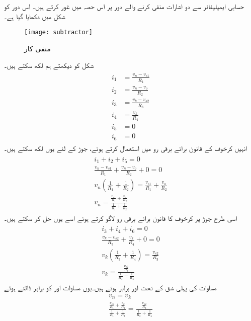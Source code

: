 
حسابی ایمپلیفائر سے دو اشارات منفی کرنے والے دور پر اس حصہ میں غور کرتے ہیں۔ اس دور کو شکل  میں دکھایا گیا ہے۔
\begin{figure}
\centering
\texttt{[image: subtractor]}
\caption{منفی کار}
\label{شکل_منفی_کار}
\end{figure}
شکل کو دیکھتے ہم لکھ سکتے ہیں۔
\begin{gather}
\begin{aligned}
i_1 &= \frac{v_n-v_{s1}}{R_1}\\
i_2&=\frac{v_n-v_o}{R_2}\\
i_3&=\frac{v_k-v_{s2}}{R_3}\\
i_4&=\frac{v_k}{R_4}\\
i_5&=0\\
i_6&=0
\end{aligned}
\end{gather}
انہیں کرخوف کے قانون برائے برقی رو میں  استعمال کرتے ہوئے، جوڑ   کے لئے یوں لکھ سکتے ہیں۔
\begin{gather} \label{مساوات_منفی_کار_منفی_سرے_پر_دباو}
\begin{aligned}
 i_1+i_2+i_5=0\\
\frac{v_n-v_{s1}}{R_1}+\frac{v_n-v_o}{R_2}+0=0\\
v_n \left(\frac{1}{R_1}+\frac{1}{R_2} \right)=\frac{v_{s1}}{R_1}+\frac{v_o}{R_2}\\
v_n=\frac{\frac{v_{s1}}{R_1}+\frac{v_o}{R_2}}{\frac{1}{R_1}+\frac{1}{R_2}}
\end{aligned}
\end{gather}
اسی طرح جوڑ   پر کرخوف کا قانون برائے برقی رو لاگو کرتے ہوئے اسے یوں حل کر سکتے ہیں۔
\begin{gather} \label{مساوات_منفی_کار_مثبت_سرے_پر_دباو}
\begin{aligned}
i_3+i_4+i_6=0\\
\frac{v_k-v_{s2}}{R_3}+\frac{v_k}{R_4}+0=0\\
v_k \left(\frac{1}{R_3}+\frac{1}{R_4} \right)=\frac{v_{s2}}{R_3}\\
v_k=\frac{\frac{v_{s2}}{R_3}}{\frac{1}{R_3}+\frac{1}{R_4} }
\end{aligned}
\end{gather}
مساوات  کی پہلی شق کے تحت   اور  برابر ہوتے ہیں۔یوں مساوات   اور   کو برابر ڈالتے ہوئے
\begin{align*}
v_n=v_k\\
\frac{\frac{v_{s1}}{R_1}+\frac{v_o}{R_2}}{\frac{1}{R_1}+\frac{1}{R_2}}=\frac{\frac{v_{s2}}{R_3}}{\frac{1}{R_3}+\frac{1}{R_4} }
\end{align*}
